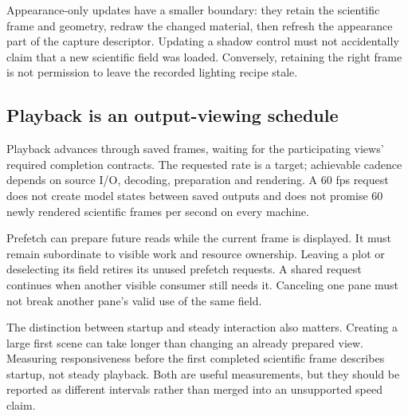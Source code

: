Appearance-only updates have a smaller boundary: they retain the scientific
frame and geometry, redraw the changed material, then refresh the appearance
part of the capture descriptor. Updating a shadow control must not accidentally
claim that a new scientific field was loaded. Conversely, retaining the right
frame is not permission to leave the recorded lighting recipe stale.

\subsection{Playback is an output-viewing schedule}
Playback advances through saved frames, waiting for the participating views'
required completion contracts. The requested rate is a target; achievable
cadence depends on source I/O, decoding, preparation and rendering. A 60 fps
request does not create model states between saved outputs and does not promise
60 newly rendered scientific frames per second on every machine.

Prefetch can prepare future reads while the current frame is displayed. It must
remain subordinate to visible work and resource ownership. Leaving a plot or
deselecting its field retires its unused prefetch requests. A shared request
continues when another visible consumer still needs it. Canceling one pane must
not break another pane's valid use of the same field.

The distinction between startup and steady interaction also matters. Creating a
large first scene can take longer than changing an already prepared view.
Measuring responsiveness before the first completed scientific frame describes
startup, not steady playback. Both are useful measurements, but they should be
reported as different intervals rather than merged into an unsupported speed
claim.
